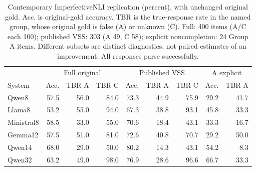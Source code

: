 \begin{table}[t]
\centering
\caption{Contemporary ImperfectiveNLI replication (percent), with unchanged original gold. Acc. is original-gold accuracy. TBR is the true-response rate in the named group, whose original gold is false (A) or unknown (C). Full: 400 items (A/C each 100); published VSS: 303 (A 49, C 58); explicit noncompletion: 24 Group A items. Different subsets are distinct diagnostics, not paired estimates of an improvement. All responses parse successfully.}
\label{tab:replication_results}
\setlength{\tabcolsep}{5pt}
\begin{tabular}{lrrrrrrrr}
\toprule
 & \multicolumn{3}{c}{Full original} & \multicolumn{3}{c}{Published VSS} & \multicolumn{2}{c}{A explicit}\\
System & Acc. & TBR A & TBR C & Acc. & TBR A & TBR C & Acc. & TBR A\\
\midrule
Qwen8 & 57.5 & 56.0 & 84.0 & 73.3 & 44.9 & 75.9 & 29.2 & 41.7 \\
Llama8 & 53.2 & 55.0 & 94.0 & 67.3 & 38.8 & 93.1 & 45.8 & 33.3 \\
Ministral8 & 58.5 & 33.0 & 55.0 & 70.6 & 18.4 & 43.1 & 33.3 & 16.7 \\
Gemma12 & 57.5 & 51.0 & 81.0 & 72.6 & 40.8 & 70.7 & 29.2 & 50.0 \\
Qwen14 & 68.0 & 29.0 & 50.0 & 80.2 & 14.3 & 43.1 & 54.2 & 8.3 \\
Qwen32 & 63.2 & 49.0 & 98.0 & 76.9 & 28.6 & 96.6 & 66.7 & 33.3 \\
\bottomrule
\end{tabular}
\end{table}
